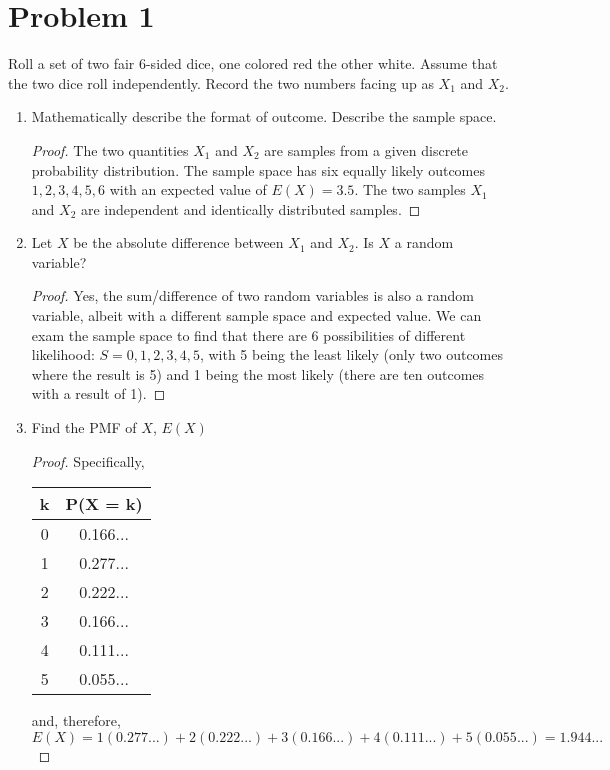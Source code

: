 \documentclass{article}
\begin{document}
\section{Problem 1}
Roll a set of two fair 6-sided dice, one colored red the other white. Assume that the two dice
roll independently. Record the two numbers facing up as $X_1$ and $X_2$.

\begin{enumerate}[label=\roman*)]
    \item  Mathematically describe the format of outcome. Describe the sample space.
        \begin{proof}
            The two quantities $X_1$ and $X_2$ are samples from a given discrete
            probability distribution. The sample space has six equally likely
            outcomes ${1, 2, 3, 4, 5, 6}$ with an expected value of $E(X) =
            3.5$. The two samples $X_1$ and $X_2$ are independent and
            identically distributed samples. 
        \end{proof}
    \item Let $X$ be the absolute difference between $X_1$ and $X_2$. Is $X$ a random variable?
        \begin{proof}
            Yes, the sum/difference of two random variables is also a random
            variable, albeit with a different sample space and expected value.
            We can exam the sample space to find that there are 6 possibilities
            of different likelihood: $S = {0, 1, 2, 3, 4, 5}$, with 5 being the
            least likely (only two outcomes where the result is 5) and 1 being
            the most likely (there are ten outcomes with a result of 1).
        \end{proof}
    \item Find the PMF of $X$, $E(X)$
        \begin{proof}
            Specifically, 
            \begin{center}
            \begin{tabular}{||c c||} 
                \hline
                k & P(X = k)\\ [0.5ex] 
                \hline\hline
                0 & 0.166... \\ 
                \hline
                1 & 0.277... \\ 
                \hline
                2 & 0.222... \\
                \hline
                3 & 0.166... \\
                \hline
                4 & 0.111... \\
                \hline
                5 & 0.055... \\ 
                \hline
            \end{tabular}
            \end{center}
            and, therefore, 
            \[ E(X) = 1(0.277...) + 2(0.222...) + 3(0.166...) + 4(0.111...)
            + 5(0.055...) =  1.944...\]
        \end{proof}
\end{enumerate}
\end{document}

